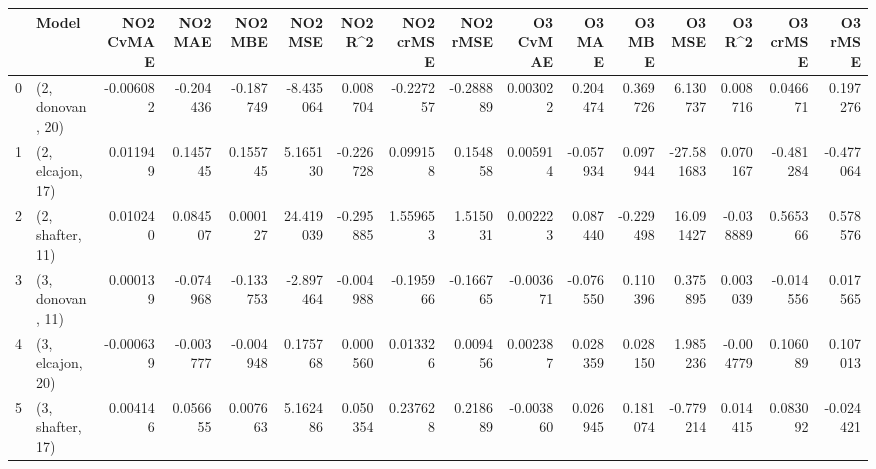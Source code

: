 \begin{tabular}{llrrrrrrrrrrrrrr}
\toprule
{} &             Model &  NO2 CvMAE &   NO2 MAE &   NO2 MBE &    NO2 MSE &   NO2 R\textasciicircum2 &  NO2 crMSE &  NO2 rMSE &  O3 CvMAE &    O3 MAE &    O3 MBE &     O3 MSE &    O3 R\textasciicircum2 &  O3 crMSE &   O3 rMSE \\
\midrule
0 &  (2, donovan, 20) &  -0.006082 & -0.204436 & -0.187749 &  -8.435064 &  0.008704 &  -0.227257 & -0.288889 &  0.003022 &  0.204474 &  0.369726 &   6.130737 &  0.008716 &  0.046671 &  0.197276 \\
1 &  (2, elcajon, 17) &   0.011949 &  0.145745 &  0.155745 &   5.165130 & -0.226728 &   0.099158 &  0.154858 &  0.005914 & -0.057934 &  0.097944 & -27.581683 &  0.070167 & -0.481284 & -0.477064 \\
2 &  (2, shafter, 11) &   0.010240 &  0.084507 &  0.000127 &  24.419039 & -0.295885 &   1.559653 &  1.515031 &  0.002223 &  0.087440 & -0.229498 &  16.091427 & -0.038889 &  0.565366 &  0.578576 \\
3 &  (3, donovan, 11) &   0.000139 & -0.074968 & -0.133753 &  -2.897464 & -0.004988 &  -0.195966 & -0.166765 & -0.003671 & -0.076550 &  0.110396 &   0.375895 &  0.003039 & -0.014556 &  0.017565 \\
4 &  (3, elcajon, 20) &  -0.000639 & -0.003777 & -0.004948 &   0.175768 &  0.000560 &   0.013326 &  0.009456 &  0.002387 &  0.028359 &  0.028150 &   1.985236 & -0.004779 &  0.106089 &  0.107013 \\
5 &  (3, shafter, 17) &   0.004146 &  0.056655 &  0.007663 &   5.162486 &  0.050354 &   0.237628 &  0.218689 & -0.003860 &  0.026945 &  0.181074 &  -0.779214 &  0.014415 &  0.083092 & -0.024421 \\
\bottomrule
\end{tabular}
